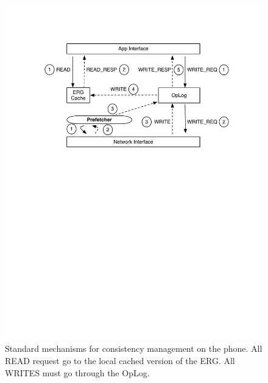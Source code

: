 \begin{figure}[htb!]
\begin{center}
\includegraphics[scale=0.50]{figs/standard_interaction}
\caption{Standard mechanisms for consistency management on the phone.  All READ request go to the local
cached version of the ERG.  All WRITES must go through the OpLog.}
\label{fig:interactions}
\end{center}
\end{figure}


